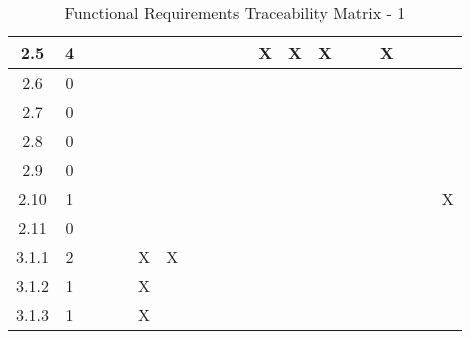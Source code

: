 \documentclass[titlepage]{article}
\begin{document}
\begin{center}
\begin{table}[h!]
\begin{tabular}{|c|c|c|c|c |c|c|c|c|c |c|c|c|c|c |c|c|c|c|c|}
2.5 &4&&& &&&&& &&X&X&X& &&X&&&\\\hline
2.6 &0&&& &&&&& &&&&& &&&&&\\\hline
2.7 &0&&& &&&&& &&&&& &&&&&\\\hline
2.8 &0&&& &&&&& &&&&& &&&&&\\\hline
2.9 &0&&& &&&&& &&&&& &&&&&\\\hline
2.10 &1&&& &&&&& &&&&& &&&&&X\\\hline
2.11 &0&&& &&&&& &&&&& &&&&&\\\hline
3.1.1 &2&&& &X&X&&& &&&&& &&&&&\\\hline
3.1.2 &1&&& &X&&&& &&&&& &&&&&\\\hline
3.1.3 &1&&& &X&&&& &&&&& &&&&&\\\hline
\end{tabular}
\caption{Functional Requirements Traceability Matrix - 1}
\end{table}
\end{center}
\end{document}
